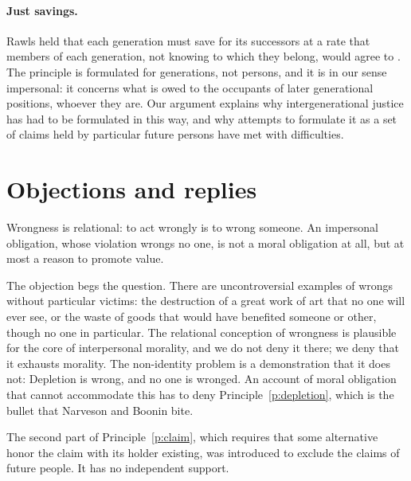 \documentclass{situationist-preprint}
\begin{document}
\paragraph{Just savings.} Rawls held that each generation must save for its successors at a rate that members of each generation, not knowing to which they belong, would agree to \citep[\S 44]{Rawls1971}. The principle is formulated for generations, not persons, and it is in our sense impersonal: it concerns what is owed to the occupants of later generational positions, whoever they are. Our argument explains why intergenerational justice has had to be formulated in this way, and why attempts to formulate it as a set of claims held by particular future persons have met with difficulties.

\section{Objections and replies}\label{s:objections}

\begin{objection}
Wrongness is relational: to act wrongly is to wrong someone. An impersonal obligation, whose violation wrongs no one, is not a moral obligation at all, but at most a reason to promote value.
\end{objection}

\begin{reply}
The objection begs the question. There are uncontroversial examples of wrongs without particular victims: the destruction of a great work of art that no one will ever see, or the waste of goods that would have benefited someone or other, though no one in particular. The relational conception of wrongness is plausible for the core of interpersonal morality, and we do not deny it there; we deny that it exhausts morality. The non-identity problem is a demonstration that it does not: Depletion is wrong, and no one is wronged. An account of moral obligation that cannot accommodate this has to deny Principle~\ref{p:depletion}, which is the bullet that Narveson and Boonin bite.
\end{reply}

\begin{objection}
The second part of Principle~\ref{p:claim}, which requires that some alternative honor the claim with its holder existing, was introduced to exclude the claims of future people. It has no independent support.
\end{objection}
\end{document}
